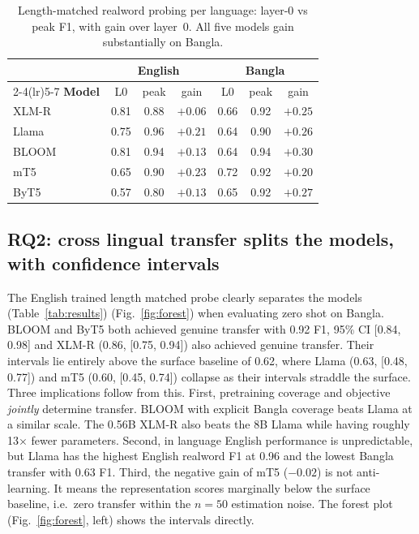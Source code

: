\documentclass[preprint,12pt]{elsarticle}
\begin{document}
\begin{table}[H]
\caption{Length-matched realword probing per language: layer-0 vs peak F1, with gain over layer~0. All five models gain substantially on Bangla.}
\label{tab:realword}
\centering
\small
\setlength{\tabcolsep}{4pt}
\begin{tabular}{lcccccc}
\toprule
& \multicolumn{3}{c}{\textbf{English}} & \multicolumn{3}{c}{\textbf{Bangla}} \\
\cmidrule(lr){2-4}\cmidrule(lr){5-7}
\textbf{Model} & L0 & peak & gain & L0 & peak & gain \\
\midrule
XLM-R & 0.81 & 0.88 & $+0.06$ & 0.66 & 0.92 & $+0.25$ \\
Llama & 0.75 & 0.96 & $+0.21$ & 0.64 & 0.90 & $+0.26$ \\
BLOOM & 0.81 & 0.94 & $+0.13$ & 0.64 & 0.94 & $+0.30$ \\
mT5   & 0.65 & 0.90 & $+0.23$ & 0.72 & 0.92 & $+0.20$ \\
ByT5  & 0.57 & 0.80 & $+0.13$ & 0.65 & 0.92 & $+0.27$ \\
\bottomrule
\end{tabular}
\end{table}

\subsection{RQ2: cross lingual transfer splits the models, with confidence intervals}
The English trained length matched probe clearly separates the models (Table~\ref{tab:results}) (Fig.~\ref{fig:forest}) when evaluating zero shot on Bangla. BLOOM and ByT5 both achieved genuine transfer with 0.92 F1, 95\% CI [0.84, 0.98] and XLM-R (0.86, [0.75, 0.94]) also achieved genuine transfer. Their intervals lie entirely above the surface baseline of 0.62, where Llama (0.63, [0.48, 0.77]) and mT5 (0.60, [0.45, 0.74]) collapse as their intervals straddle the surface. Three implications follow from this. First, pretraining coverage and objective \emph{jointly} determine transfer. BLOOM with explicit Bangla coverage beats Llama at a similar scale. The 0.56B XLM-R also beats the 8B Llama while having roughly 13$\times$ fewer parameters. Second, in language English performance is unpredictable, but Llama has the highest English realword F1 at 0.96 and the lowest Bangla transfer with 0.63 F1. Third, the negative gain of mT5 ($-0.02$) is not anti-learning. It means the representation scores marginally below the surface baseline, i.e.\ zero transfer within the $n = 50$ estimation noise. The forest plot (Fig.~\ref{fig:forest}, left) shows the intervals directly.
\end{document}
